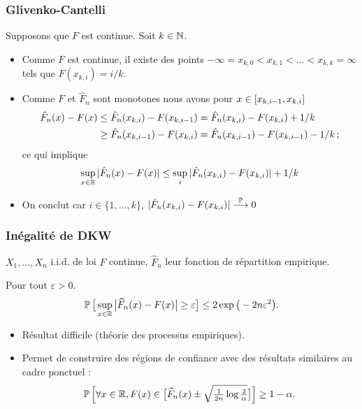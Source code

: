 \begin{frame}
\frametitle{Glivenko-Cantelli}
Supposons que $F$ est continue. Soit $k \in \mathbb{N}$. 
\begin{itemize}
\pause \item Comme $F$ est continue, il existe des points $-\infty= x_{k,0} < x_{k,1} < \dots < x_{k,k}= \infty$ tels que $F(x_{k,i})= i /k$.
\pause \item Comme $F$ et $\hat{F}_n$ sont \alert{monotones} nous avons pour $x \in \left[x_{k,i-1},x_{k,i}\right]$
\begin{align*}
\hat{F}_n(x) - F(x) &\leq \hat{F}_n(x_{k,i}) - F(x_{k,i-1})= \hat{F}_n(x_{k,i}) - F(x_{k,i}) + 1/k \\
&\geq \hat{F}_n(x_{k,i-1}) - F(x_{k,i}) = \hat{F}_n(x_{k,i-1})- F(x_{k,i-1}) - 1/k \,;
\end{align*}
ce qui implique 
\[
\sup_{x \in \mathbb{R}} |\hat{F}_n(x) - F(x)| \leq \sup_i |\hat{F}_n(x_{k,i}) - F(x_{k,i})| + 1/k
\]
\pause \item On conclut car $i \in \{1,\dots,k\}$, $|\hat{F}_n(x_{k,i})- F(x_{k,i})| \stackrel{\operatorname{{\mathbb P}}}{\longrightarrow} 0$
\end{itemize}
\end{frame}

\begin{frame}
\frametitle{Inégalité de DKW}
$X_1,\ldots, X_n$ i.i.d. de loi $F$ \alert{continue}, $\widehat F_n$ leur fonction de répartition empirique.
\begin{prop} Pour tout $\varepsilon >0$.
$$\operatorname{{\mathbb P}}\big[\sup_{x \in \operatorname{{\mathbb R}}}\big|\widehat F_n(x)-F(x)\big|\geq \varepsilon\big] \leq 2 \exp\big(-2n\varepsilon^2\big).$$
\end{prop}
\begin{itemize}
\item Résultat difficile (théorie des processus empiriques).
\item Permet de construire des \alert{régions} de confiance avec des résultats similaires au cadre ponctuel :
$$\operatorname{{\mathbb P}}\Big[\forall x \in \operatorname{{\mathbb R}}, F(x)\in \big[\widehat F_n(x)\pm\sqrt{\tfrac{1}{2n}\log \tfrac{2}{\alpha}}\big]\Big]\geq 1-\alpha.$$
\end{itemize}
\end{frame}
